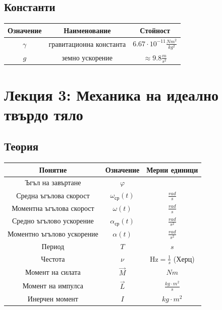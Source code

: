\documentclass[fleqn, 12pt]{article}
\theoremstyle{definition}
\begin{document}
\subsection{Константи}

\begin{center}
\begin{tabular}{ |c|c|c|}
\hline
\textbf{Означение} & \textbf{Наименование}&\textbf{Стойност}\\
\hline
$\gamma$ & гравитационна константа & $6.67 \cdot 10^{-11} \frac{N m^2}{kg^2}$ \\
\hline
$g$ & земно ускорение & $\approx 9.8 \frac{m}{s^2}$ \\
\hline
\end{tabular}
\end{center}

\newpage
\section{Лекция 3: Механика на идеално твърдо тяло}

\subsection{Теория}

\begin{center}
\begin{tabular}{ |c|c|c|}
\hline
\textbf{Понятие} &\textbf{Означение} & \textbf{Мерни единици}\\
\hline
Ъгъл на завъртане & $\varphi $ & \\
\hline
Средна ъгълова скорост & $\omega_{\text{ср}} (t)$ & $\frac{rad}{s}$\\
\hline
Моментна ъгълова скорост & $\omega (t)$ & $\frac{rad}{s}$\\
\hline
Средно ъгълово ускорение & $\alpha_{\text{ср}} (t)$ & $\frac{rad}{s^2}$\\
\hline
Моментно ъгълово ускорение & $\alpha (t)$ & $\frac{rad}{s^2}$\\
\hline
Период & $T$ & $s$ \\
\hline 
Честота & $\nu$ & $\text{Hz} = \frac{1}{s}$ (Херц)\\
\hline 
Момент на силата & $ \vec{M} $ & $Nm$\\
\hline 
Момент на импулса & $ \vec{L} $ & $\frac{kg \cdot m^2}{s}$\\
\hline
Инерчен момент & $I$ & $kg \cdot m^2$\\
\hline
\end{tabular}
\end{center}
\newpage
\end{document}
